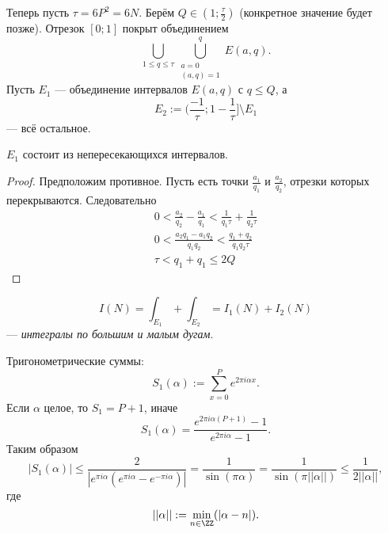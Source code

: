 \documentclass[12pt,a4paper]{article}
\begin{document}
    Теперь пусть $\tau = 6 P^2 = 6N$. Берём $Q \in (1; \frac{\tau}{2})$ (конкретное значение будет позже). Отрезок $[0; 1]$ покрыт объединением
    \[\bigcup_{1 \leqslant q \leqslant \tau} \bigcup_{\substack{a = 0\\ (a, q) = 1}}^q E(a, q).\]
    Пусть $E_1$ --- объединение интервалов $E(a, q)$ с $q \leqslant Q$, а
    \[E_2 := (\frac{-1}{\tau}; 1 - \frac{1}{\tau}] \setminus E_1\]
    --- всё остальное.

    \begin{theorem}
        $E_1$ состоит из непересекающихся интервалов.
    \end{theorem}

    \begin{proof}
        Предположим противное. Пусть есть точки $\frac{a_1}{q_1}$ и $\frac{a_2}{q_2}$, отрезки которых перекрываются. Следовательно
        \begin{gather*}
            0 < \frac{a_2}{q_2} - \frac{a_1}{q_1} < \frac{1}{q_1 \tau} + \frac{1}{q_2 \tau}\\
            0 < \frac{a_2 q_1 - a_1 q_2}{q_1 q_2} < \frac{q_1 + q_2}{q_1 q_2 \tau}\\
            \tau < q_1 + q_1 \leqslant 2Q
        \end{gather*}
    \end{proof}

    \[I(N) = \int_{E_1} + \int_{E_2} = I_1(N) + I_2(N)\]
    --- \emph{интегралы по большим и малым дугам}.

    Тригонометрические суммы:
    \[S_1(\alpha) := \sum_{x=0}^P e^{2 \pi i \alpha x}.\]
    Если $\alpha$ целое, то $S_1 = P+1$, иначе
    \[S_1(\alpha) = \frac{e^{2 \pi i \alpha (P+1)} - 1}{e^{2 \pi i \alpha} - 1}.\]
    Таким образом
    \[|S_1(\alpha)| \leqslant \frac{2}{|e^{\pi i \alpha}(e^{\pi i \alpha} - e^{-\pi i \alpha})|} = \frac{1}{\sin(\pi \alpha)} = \frac{1}{\sin(\pi ||\alpha||)} \leqslant \frac{1}{2 ||\alpha||},\]
    где
    \[||\alpha|| := \min_{n \in \ZZ}(|\alpha - n|).\]
\end{document}
